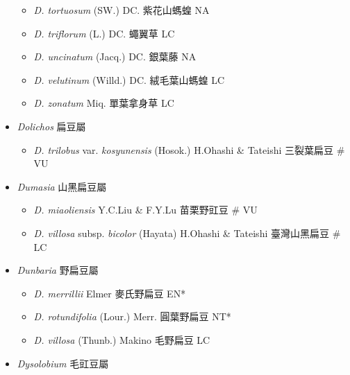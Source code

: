 \begin{itemize}
\begin{itemize}
        \item[] \textit{D. tortuosum} (SW.) DC.  紫花山螞蝗   NA
        \item[] \textit{D. triflorum} (L.) DC.  蠅翼草   LC
        \item[] \textit{D. uncinatum} (Jacq.) DC.  銀葉藤   NA
        \item[] \textit{D. velutinum} (Willd.) DC.  絨毛葉山螞蝗   LC
        \item[] \textit{D. zonatum} Miq.  單葉拿身草   LC
  \end{itemize}
 \item[] \textit{Dolichos} 扁豆屬
                                
  \begin{itemize}
        \item[] \textit{D. trilobus} var. \textit{kosyunensis} (Hosok.) H.Ohashi \& Tateishi  三裂葉扁豆  \# VU
  \end{itemize}
 \item[] \textit{Dumasia} 山黑扁豆屬
                                
  \begin{itemize}
        \item[] \textit{D. miaoliensis} Y.C.Liu \& F.Y.Lu  苗栗野豇豆  \# VU
        \item[] \textit{D. villosa} subsp. \textit{bicolor} (Hayata) H.Ohashi \& Tateishi  臺灣山黑扁豆  \# LC
  \end{itemize}
 \item[] \textit{Dunbaria} 野扁豆屬
                                
  \begin{itemize}
        \item[] \textit{D. merrillii} Elmer  麥氏野扁豆   EN*
        \item[] \textit{D. rotundifolia} (Lour.) Merr.  圓葉野扁豆   NT*
        \item[] \textit{D. villosa} (Thunb.) Makino  毛野扁豆   LC
  \end{itemize}
 \item[] \textit{Dysolobium} 毛豇豆屬
                                

\end{itemize}
